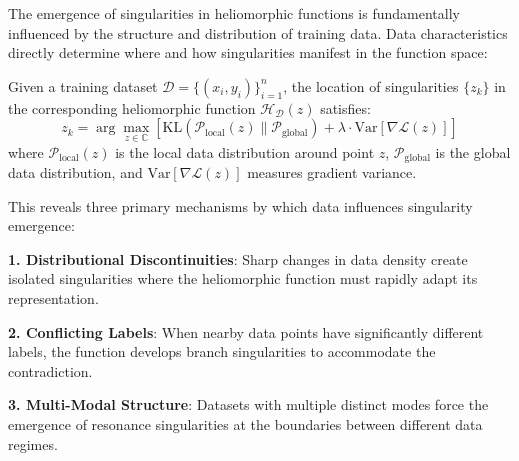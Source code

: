 The emergence of singularities in heliomorphic functions is fundamentally influenced by the structure and distribution of training data. Data characteristics directly determine where and how singularities manifest in the function space:

\begin{theorem}
Given a training dataset $\mathcal{D} = \{(x_i, y_i)\}_{i=1}^n$, the location of singularities $\{z_k\}$ in the corresponding heliomorphic function $\mathcal{H}_{\mathcal{D}}(z)$ satisfies:
\begin{equation}
z_k = \arg\max_{z \in \mathbb{C}} \left[\text{KL}(\mathcal{P}_{\text{local}}(z) \| \mathcal{P}_{\text{global}}) + \lambda \cdot \text{Var}[\nabla \mathcal{L}(z)]\right]
\end{equation}
where $\mathcal{P}_{\text{local}}(z)$ is the local data distribution around point $z$, $\mathcal{P}_{\text{global}}$ is the global data distribution, and $\text{Var}[\nabla \mathcal{L}(z)]$ measures gradient variance.
\end{theorem}

This reveals three primary mechanisms by which data influences singularity emergence:

\textbf{1. Distributional Discontinuities}: Sharp changes in data density create isolated singularities where the heliomorphic function must rapidly adapt its representation.

\textbf{2. Conflicting Labels}: When nearby data points have significantly different labels, the function develops branch singularities to accommodate the contradiction.

\textbf{3. Multi-Modal Structure}: Datasets with multiple distinct modes force the emergence of resonance singularities at the boundaries between different data regimes.

